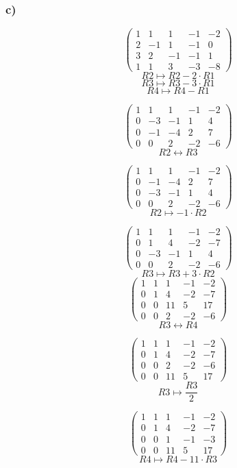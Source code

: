 \documentclass[lineaire_algebra_oplossingen.tex]{subfiles}
\begin{document}
\subsubsection*{c)}
\[
\begin{pmatrix}
1 & 1 & 1 &-1&-2\\
2 & -1 & 1 & -1 & 0\\
3 & 2 & -1 & -1 & 1\\
1 & 1 & 3 & -3 & -8
\end{pmatrix}
\]
\[ R2 \longmapsto R2 - 2\cdot R1\]
\[ R3 \longmapsto R3 - 3\cdot R1\]
\[ R4 \longmapsto R4 - R1\]

\[
\begin{pmatrix}
1 & 1 & 1 & -1 & -2\\
0 & -3 & -1 & 1 & 4\\
0 & -1 & -4 & 2 & 7\\
0 & 0 & 2 & -2 & -6
\end{pmatrix}
\]
\[ R2 \leftrightarrow R3\]

\[
\begin{pmatrix}
1 & 1 & 1 & -1 & -2\\
0 & -1 & -4 & 2 & 7\\
0 & -3 & -1 & 1 & 4\\
0 & 0 & 2 & -2 & -6
\end{pmatrix}
\]
\[ R2 \longmapsto  -1\cdot R2\]

\[
\begin{pmatrix}
1 & 1 & 1 & -1 & -2\\
0 & 1 & 4 & -2 & -7\\
0 & -3 & -1 & 1 & 4\\
0 & 0 & 2 & -2 & -6
\end{pmatrix}
\]
\[ R3 \longmapsto R3 + 3\cdot R2\]
\[
\begin{pmatrix}
1 & 1 & 1 & -1 & -2\\
0 & 1 & 4 & -2 & -7\\
0 & 0 & 11 & 5 & 17\\
0 & 0 & 2 & -2 & -6
\end{pmatrix}
\]
\[ R3 \leftrightarrow R4\]

\[
\begin{pmatrix}
1 & 1 & 1 & -1 & -2\\
0 & 1 & 4 & -2 & -7\\
0 & 0 & 2 & -2 & -6\\
0 & 0 & 11 & 5 & 17
\end{pmatrix}
\]
\[ R3 \longmapsto  \frac{R3}{2}
\]

\[
\begin{pmatrix}
1 & 1 & 1 & -1 & -2\\
0 & 1 & 4 & -2 & -7\\
0 & 0 & 1 & -1 & -3\\
0 & 0 & 11 & 5 & 17
\end{pmatrix}
\]
\[ R4 \longmapsto R4 - 11\cdot R3\]
\end{document}
